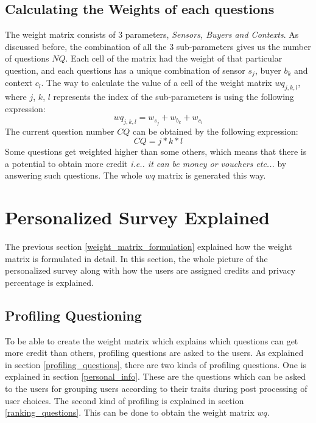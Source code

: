 \subsection{Calculating the Weights of each questions}
The weight matrix consists of 3 parameters, {\it Sensors, Buyers and Contexts}. As discussed before, the combination
of all the 3 sub-parameters gives us the number of questions $NQ$. Each cell of the matrix had the weight of that particular question,
and each questions has a unique combination of sensor $s_j$, buyer $b_k$ and context $c_l$. The way to calculate the value of a cell of the weight matrix $wq_{j,k,l}$, where $j$, $k$, $l$
represents the index of the sub-parameters
is using the following expression:
$$wq_{j,k,l} = w_{s_{j}} + w_{b_{k}} + w_{c_{l}}$$
The current question number $CQ$ can be obtained by the following expression:
 $$CQ = j*k*l$$
Some questions get weighted higher than some others, which means that there is a potential
to obtain more credit {\it i.e.. it can be money or vouchers etc...} by answering such questions. The whole $wq$ matrix is generated this way.

\section{Personalized Survey Explained}
The previous section \ref{weight_matrix_formulation} explained how the weight matrix is formulated in detail. In this section, the whole picture of the personalized survey
along with how the users are assigned credits and privacy percentage is explained.


\subsection{Profiling Questioning} \label{in_action_profiling}
To be able to create the weight matrix which explains which questions can get more credit than others, profiling questions are
asked to the users. As explained in section \ref{profiling_questions}, there are two kinds of profiling questions. One is explained in
section 	\ref{personal_info}. These are the questions which can be asked to the users for grouping users according to their traits
during post processing of user choices. The second kind of profiling is explained in section \ref{ranking_questions}. This can be done
to obtain the weight matrix $wq$.\\

